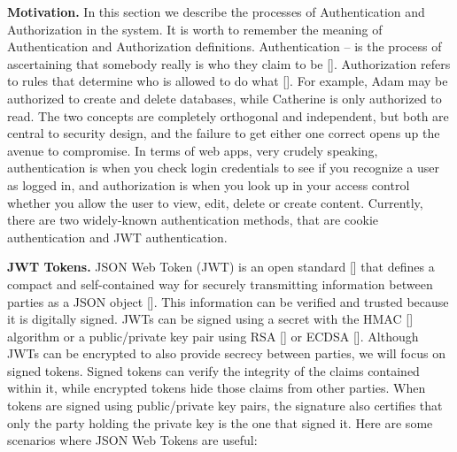 \textbf{Motivation.} In this section we describe the processes of Authentication and Authorization in the system.
It is worth to remember the meaning of Authentication and Authorization definitions.
Authentication -- is the process of ascertaining that somebody really is who they claim to be [\cite{burrows1989logic}].
Authorization refers to rules that determine who is allowed to do what [\cite{fagin1978authorization}].
For example, Adam may be authorized to create and delete databases, while Catherine is only authorized to read.
The two concepts are completely orthogonal and independent, but both are central to security design, and the
failure to get either one correct opens up the avenue to compromise.
In terms of web apps, very crudely speaking, authentication is when you check login credentials to see if you recognize
a user as logged in, and authorization is when you look up in your access control whether you allow the user to view,
edit, delete or create content.
Currently, there are two widely-known authentication methods, that are cookie authentication and JWT authentication.

\textbf{JWT Tokens.}
JSON Web Token (JWT) is an open standard [\cite{jones2015rfc}] that defines a compact and self-contained way for securely
transmitting information between parties as a JSON object [\cite{jones2015json}].
This information can be verified and trusted because it is digitally signed.
JWTs can be signed using a secret with the HMAC [\cite{wang2004hmac}] algorithm or a public/private key pair using
RSA [\cite{wiener1990cryptanalysis}] or ECDSA [\cite{johnson2001elliptic}].
Although JWTs can be encrypted to also provide secrecy between parties, we will focus on signed tokens.
Signed tokens can verify the integrity of the claims contained within it, while encrypted tokens hide those claims from
other parties.
When tokens are signed using public/private key pairs, the signature also certifies that only the party holding the
private key is the one that signed it.
Here are some scenarios where JSON Web Tokens are useful:

